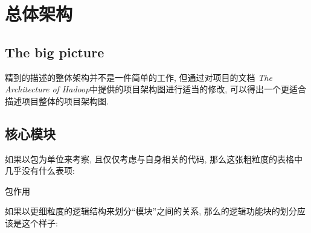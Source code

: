 \chapter{\HFS 总体架构}
\label{ch:hfs}

\section{The big picture}
\label{sec:hfs:bigpic}

精到的描述\HFS 的整体架构并不是一件简单的工作, 但通过对{\Apache\space\Hadoop}项目的文档
\emph{The Architecture of Hadoop}中提供的项目架构图进行适当的修改,
可以得出一个更适合描述\HFS 项目整体的项目架构图.

\blankfigure

\section{核心模块}
\label{sec:hfs:modules}

如果以包为单位来考察\HFS, 且仅仅考虑与\HFS 自身相关的代码, 那么这张粗粒度的表格中几乎没有什么表项:
\begin{XeDuoLineTabular}{包}{作用}
\end{XeDuoLineTabular}

如果以更细粒度的逻辑结构来划分``模块''之间的关系, 那么\HFS 的逻辑功能块的划分应该是这个样子:
\begin{XeDuoLineTabular}
\end{XeDuoLineTabular}
